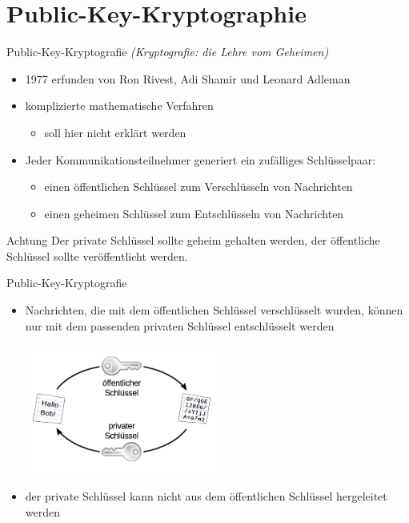 \documentclass{beamer}
\begin{document}
\section{Public-Key-Kryptographie}
\begin{frame}{Public-Key-Kryptografie}
\emph{(Kryptografie: die Lehre vom Geheimen)}

\begin{itemize}
	\item 1977 erfunden von Ron Rivest, Adi Shamir und Leonard Adleman
	\item komplizierte mathematische Verfahren
	\begin{itemize}
		\item soll hier nicht erklärt werden
	\end{itemize}
	\item Jeder Kommunikationsteilnehmer generiert ein zufälliges Schlüsselpaar:
	\begin{itemize}
		\item einen öffentlichen Schlüssel zum Verschlüsseln von Nachrichten
		\item einen geheimen Schlüssel zum Entschlüsseln von Nachrichten
	\end{itemize}
\end{itemize}
\begin{alertblock}{Achtung}
	Der private Schlüssel sollte geheim gehalten werden, der öffentliche Schlüssel
	sollte veröffentlicht werden.
\end{alertblock}
\end{frame}

\begin{frame}{Public-Key-Kryptografie}
	\begin{itemize}
		\item Nachrichten, die mit dem öffentlichen Schlüssel verschlüsselt wurden,
			können nur mit dem passenden privaten Schlüssel entschlüsselt werden
		\vfill
		\begin{center}
			\includegraphics[width=0.5\textwidth]{public-private-keys.pdf}
		\end{center}
		\vfill
		\item der private Schlüssel kann nicht aus dem öffentlichen Schlüssel
			hergeleitet werden
	\end{itemize}
\end{frame}
\end{document}
